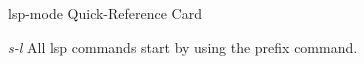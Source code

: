 \documentclass[a4paper,10pt]{article}
\newcommand\meta[1]{\textlangle\textit{#1}\textrangle}
\newcommand\keyify[1]{\keys{\ttfamily#1}}
\newcommand{\prefix}{\meta{s-l}}
\begin{document}
\begin{center}
  \Huge
  lsp-mode Quick-Reference Card
  \par\bigskip
\end{center}

\begin{center}
  \begin{tcolorbox}[title=Getting Help for lsp-mode , center title, fonttitle=\Large\bfseries]
    \begin{keylist}[labelindent=4ex,before=,labelwidth=\widthof{\keyify{\meta{prefix}
          C-h}}]
    \item[\prefix] All lsp commands start by using the prefix command.

    \end{keylist}
  \end{tcolorbox}
\end{center}
\bigskip

\setlength{\columnsep}{1cm}
\end{document}
